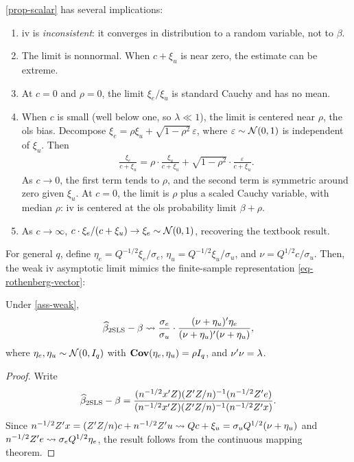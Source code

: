\documentclass[a4paper,12pt]{article}
\begin{document}
\begin{remark}[Interpretation]\label{rmk-interpretation}
	\autoref{prop-scalar} has several implications:
	\begin{enumerate}
		\item \gls{iv} is \emph{inconsistent}: it converges in distribution to a random variable, not to $\beta$.
		\item The limit is nonnormal. When $c+\xi_u$ is near zero, the estimate can be extreme.
		\item At $c=0$ and $\rho=0$, the limit $\xi_e/\xi_u$ is standard Cauchy and has no mean.
		\item When $c$ is small (well below one, so $\lambda\ll1$), the limit is centered near $\rho$, the \gls{ols} bias.
		Decompose $\xi_e=\rho\xi_u+\sqrt{1-\rho^2}\,\varepsilon$, where $\varepsilon\sim\operatorname{\mathcal{N}}(0,1)$ is independent of $\xi_u$. Then
		\begin{align*}
			\frac{\xi_e}{c+\xi_u}
			=\rho\cdot\frac{\xi_u}{c+\xi_u}
			+\sqrt{1-\rho^2}\cdot\frac{\varepsilon}{c+\xi_u}.
		\end{align*}
		As $c\to0$, the first term tends to $\rho$,
		and the second term is symmetric around zero given $\xi_u$.
		At $c=0$, the limit is $\rho$ plus a scaled Cauchy variable, with median $\rho$:
		\gls{iv} is centered at the \gls{ols} probability limit $\beta+\rho$.
		\item As $c\to\infty$, $c\cdot\xi_e/(c+\xi_u)\to\xi_e\sim\operatorname{\mathcal{N}}(0,1)$, recovering the textbook result.
	\end{enumerate}
\end{remark}

For general $q$, define $\eta_e=Q^{-1/2}\xi_e/\sigma_e$, $\eta_u=Q^{-1/2}\xi_u/\sigma_u$, and $\nu=Q^{1/2}c/\sigma_u$.
Then, the weak \gls{iv} asymptotic limit mimics the finite-sample representation \eqref{eq-rothenberg-vector}:

\begin{theorem}\label{thm-staiger-stock}
	Under \autoref{ass-weak},
	\begin{align}\label{eq-staiger-stock}
		\widehat\beta_{\mathrm{2SLS}}-\beta
		\overset{}{\leadsto}\frac{\sigma_e}{\sigma_u}\cdot
		\frac{(\nu+\eta_u)^{\prime}\eta_e}{(\nu+\eta_u)^{\prime}(\nu+\eta_u)},
	\end{align}
	where $\eta_e,\eta_u\sim\operatorname{\mathcal{N}}(0,I_q)$ with $\operatorname{\text{\textrm{\upshape\textbf{Cov}}}}(\eta_e,\eta_u)=\rho I_q$, and $\nu^{\prime}\nu=\lambda$.
\end{theorem}
\begin{proof}
	Write
	\begin{align*}
		\widehat\beta_{\mathrm{2SLS}}-\beta
		=\frac{(n^{-1/2}x^{\prime} Z)(Z^{\prime} Z/n)^{-1}(n^{-1/2}Z^{\prime} e)}{(n^{-1/2}x^{\prime} Z)(Z^{\prime} Z/n)^{-1}(n^{-1/2}Z^{\prime} x)}.
	\end{align*}
	Since $n^{-1/2}Z^{\prime} x=(Z^{\prime} Z/n)c+n^{-1/2}Z^{\prime} u\overset{}{\leadsto} Qc+\xi_u=\sigma_uQ^{1/2}(\nu+\eta_u)$
	and $n^{-1/2}Z^{\prime} e\overset{}{\leadsto}\sigma_eQ^{1/2}\eta_e$, the result follows from the continuous mapping theorem.
\end{proof}
\end{document}
